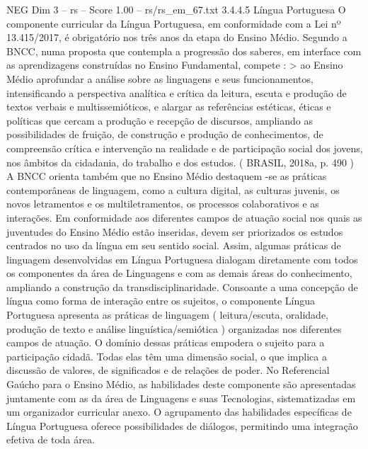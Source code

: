 \begin{textsample}{NEG Dim 3 – rs – Score 1.00 – rs/rs\_em\_67.txt}  \label{ex:f3_neg_047}
3.4.4.5 Língua Portuguesa O componente curricular da Língua Portuguesa, em conformidade com a Lei nº 13.415/2017, é obrigatório nos três anos da etapa do Ensino Médio.
Segundo a BNCC, numa proposta que contempla a progressão dos saberes, em interface com as aprendizagens construídas no Ensino Fundamental, compete : > ao Ensino Médio aprofundar a análise sobre as linguagens e seus funcionamentos, intensificando a perspectiva analítica e crítica da leitura, escuta e produção de textos verbais e multissemióticos, e alargar as referências estéticas, éticas e políticas que cercam a produção e recepção de discursos, ampliando as possibilidades de fruição, de construção e produção de conhecimentos, de compreensão crítica e intervenção na realidade e de participação social dos jovens, nos âmbitos da cidadania, do trabalho e dos estudos. ( BRASIL, 2018a, p. 490 ) A BNCC orienta também que no Ensino Médio destaquem -se as práticas contemporâneas de linguagem, como a cultura digital, as culturas juvenis, os novos letramentos e os multiletramentos, os processos colaborativos e as interações.
Em conformidade aos diferentes campos de atuação social nos quais as juventudes do Ensino Médio estão inseridas, devem ser priorizados os estudos centrados no uso da língua em seu sentido social.
Assim, algumas práticas de linguagem desenvolvidas em Língua Portuguesa dialogam diretamente com todos os componentes da área de Linguagens e com as demais áreas do conhecimento, ampliando a construção da transdisciplinaridade.
Consoante a uma concepção de língua como forma de interação entre os sujeitos, o componente Língua Portuguesa apresenta as práticas de linguagem ( leitura/escuta, oralidade, produção de texto e análise linguística/semiótica ) organizadas nos diferentes campos de atuação.
O domínio dessas práticas empodera o sujeito para a participação cidadã.
Todas elas têm uma dimensão social, o que implica a discussão de valores, de significados e de relações de poder.
No Referencial Gaúcho para o Ensino Médio, as habilidades deste componente são apresentadas juntamente com as da área de Linguagens e suas Tecnologias, sistematizadas em um organizador curricular anexo.
O agrupamento das habilidades específicas de Língua Portuguesa oferece possibilidades de diálogos, permitindo uma integração efetiva de toda área.

\end{textsample}
